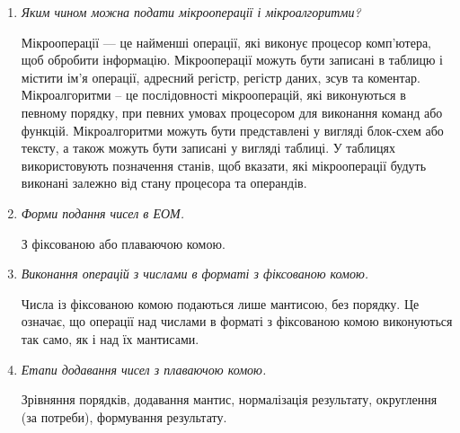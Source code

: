 \documentclass[12pt,a4paper]{article}
\begin{document}
\begin{enumerate}
        Для виявлення переповнення в комп'ютерних системах часто використовують модифіковані машинні коди, в яких додатковий знаковий розряд ЗР2 знаходиться ліворуч від основного розряду ЗР1.
        Якщо відбувається переповнення розрядної сітки, то старший знаковий розряд завжди зберігає знак результату, а сам факт переповення фіксується відмінністю знакових розрядів ЗР1 та ЗР2.

        \vspace{1em}

        \item \textit{Яким чином можна подати мікрооперації і мікроалгоритми?}
        
        Мікрооперації --- це найменші операції, які виконує процесор комп'ютера, щоб обробити інформацію.
        Мікрооперації можуть бути записані в таблицю і містити ім'я операції, адресний регістр, регістр даних, зсув та коментар.
        Мікроалгоритми – це послідовності мікрооперацій, які виконуються в певному порядку, при певних умовах процесором для виконання команд або функцій.
        Мікроалгоритми можуть бути представлені у вигляді блок-схем або тексту, а також можуть бути записані у вигляді таблиці.
        У таблицях використовують позначення станів, щоб вказати, які мікрооперації будуть виконані залежно від стану процесора та операндів.

        \vspace{1em}
    
        \item \textit{Форми подання чисел в ЕОМ.}
        
        З фіксованою або плаваючою комою.
        \vspace{1em}

        \item \textit{Виконання операцій з числами в форматі з фіксованою комою.}
        
        Числа із фіксованою комою подаються лише мантисою, без порядку. Це означає, що операції над числами в форматі з фіксованою комою виконуються так само, як і над їх мантисами.

        \vspace{1em}

        \item \textit{Етапи додавання чисел з плаваючою комою.}
        
        Зрівняння порядків, додавання мантис, нормалізація результату, округлення (за потреби), формування результату.

        \vspace{1em}


\end{enumerate}
\end{document}
